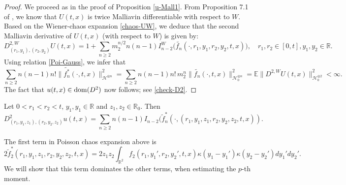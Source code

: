 \documentclass[12pt]{article}
\def\cH{\mathcal{H}}
\def\bE{\mathbb{E}}
\def\bR{\mathbb{R}}
\def\k{\kappa}
\begin{document}
\begin{proof}
We proceed as in the proof of Proposition \ref{u-Mall1}.
From Proposition 7.1 of \cite{sanz05}, we know that
$U(t,x)$ is twice Malliavin differentiable with respect to $W$. Based on the Wiener-chaos expansion \eqref{chaos-UW}, we deduce that the second Malliavin derivative of $U(t,x)$ (with respect to $W$) is given by:
\[
D_{(r_1,y_1),(r_2,y_2)}^{2,W} U(t,x)=1+\sum_{n\geq 2}m_2^{n/2}n(n-1)I_{n-2}^W\big(\widetilde{f_n}(\cdot,r_1,y_1,r_2,y_2,t,x)\big), \quad r_1,r_2 \in [0,t],y_1,y_2 \in \bR.
\]
Using relation \eqref{Poi-Gauss}, we infer that
\[
\sum_{n\geq 2}n(n-1) n! \|\widetilde{f_n^*}(\cdot,t,x)\|_{\cH^{\otimes n}}^2 =\sum_{n\geq 2}n(n-1) n! \, m_2^{n} \|\widetilde{f_n}(\cdot,t,x)\|_{\cH_0^{\otimes n}}^2 =\bE\|D^{2,W} U(t,x)\|_{\cH_0^{\otimes 2}}^2<\infty.
\]
The fact that $u(t,x)\in {\rm dom}(D^2)$ now follows; see \eqref{check-D2}.

\end{proof}

Let $0<r_1<r_2<t$, $y_1,y_1 \in \bR$ and $z_1,z_2 \in \bR_0$. Then 
\begin{equation}
\label{chaos-D2u}
D_{(r_1,y_1,z_1),(r_2,y_2,z_2)}^2 u(t,x)=\sum_{n\geq 2}n(n-1)I_{n-2}(\widetilde{f}_n^{*}(\cdot,(r_1,y_1,z_1,r_2,y_2,z_2,t,x)).
\end{equation}

The first term in Poisson chaos expansion above is 
\[
2\widetilde{f}_2^{*}(r_1,y_1,z_1,r_2,y_2,z_2,t,x)=2z_1 z_2 \int_{\bR^2} f_2(r_1,y_1',r_2,y_2',t,x)\k(y_1-y_1')\k(y_2-y_2')dy_1'dy_2'.
\]
We will show that this term dominates the other terms, when estimating the $p$-th moment.

\medskip
\end{document}
